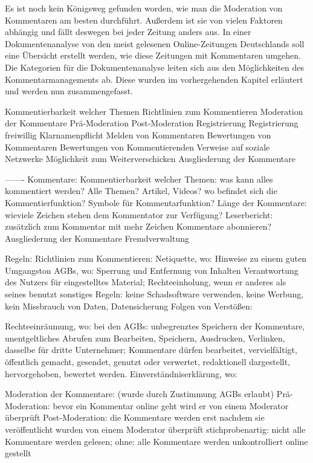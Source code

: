 

Es ist noch kein Königsweg gefunden worden, wie man die Moderation von Kommentaren am besten durchführt. Außerdem ist sie von vielen Faktoren abhängig und fällt deswegen bei jeder Zeitung anders aus. In einer Dokumentenanalyse von den meist gelesenen Online-Zeitungen Deutschlands soll eine Übersicht erstellt werden, wie diese Zeitungen mit Kommentaren umgehen. Die Kategorien für die Dokumentenanalyse leiten sich aus den Möglichkeiten des Kommentarmanagements ab. Diese wurden im vorhergehenden Kapitel erläutert und werden nun zusammengefasst. 

Kommentierbarkeit welcher Themen
Richtlinien zum Kommentieren 
Moderation der Kommentare 
Prä-Moderation
Post-Moderation
Registrierung
Registrierung freiwillig
Klarnamenpflicht
Melden von Kommentaren
Bewertungen von Kommentaren
Bewertungen von Kommentierenden
Verweise  auf soziale Netzwerke
Möglichkeit zum Weiterverschicken
Ausgliederung der Kommentare




-------
Kommentare:
	Kommentierbarkeit welcher Themen: was kann alles kommentiert werden? Alle Themen? Artikel, Videos?
	wo befindet sich die Kommentierfunktion?
	Symbole für Kommentarfunktion?
	Länge der Kommentare: wieviele Zeichen stehen dem Kommentator zur Verfügung?
	Leserbericht: zusätzlich zum Kommentar mit mehr Zeichen
	Kommentare abonnieren?
	Ausgliederung der Kommentare
	Fremdverwaltung
	

Regeln: Richtlinien zum Kommentieren:
	Netiquette, wo: Hinweise zu einem guten Umgangston
	AGBs, wo: 
			Sperrung und Entfernung von Inhalten 
			Verantwortung des Nutzers für eingestelltes Material; Rechteeinholung, wenn er anderes als seines benutzt
			sonstiges Regeln: keine Schadsoftware verwenden, keine Werbung, kein Missbrauch von Daten, Datensicherung 
			Folgen von Verstößen: 
			
			
			
	Rechteeinräumung, wo: bei den AGBs: unbegrenztes Speichern der Kommentare, unentgeltliches Abrufen zum Bearbeiten, Speichern, Ausdrucken, Verlinken, 										dasselbe für dritte Unternehmer; Kommentare dürfen bearbeitet, vervielfältigt, öffentlich gemacht, gesendet, genutzt oder 										verwertet, redaktionell dargestellt, hervorgehoben, bewertet werden.
	Einverständniserklärung, wo:
	
Moderation der Kommentare:  (wurde durch Zustimmung AGBs erlaubt)
	Prä-Moderation: bevor ein Kommentar online geht wird er von einem Moderator überprüft
	Post-Moderation: die Kommentare werden erst nachdem sie veröffentlicht wurden von einem Moderator überprüft
	stichprobenartig: nicht alle Kommentare werden gelesen; 
	ohne: alle Kommentare werden unkontrolliert online gestellt

